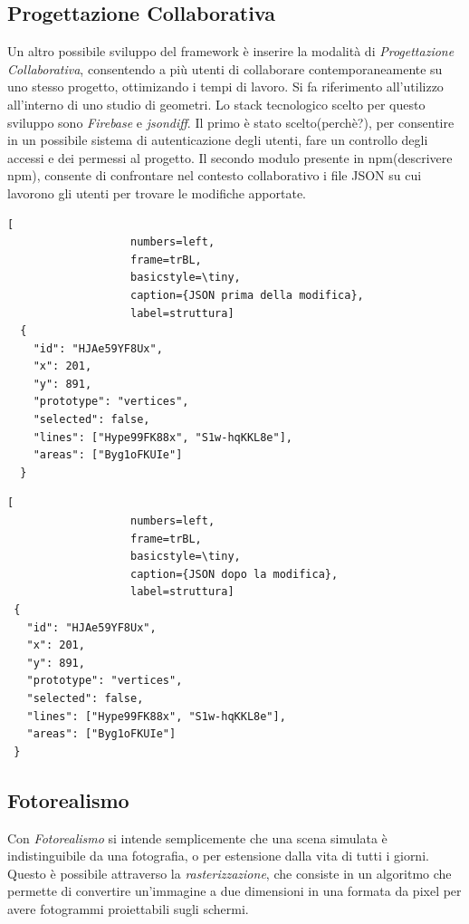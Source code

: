 \subsection{Progettazione Collaborativa}
\label{sec:conclusions_section_2_sub_2}
Un altro possibile sviluppo del framework è inserire la modalità di \emph{Progettazione Collaborativa}, consentendo a più utenti
di collaborare contemporaneamente su uno stesso progetto, ottimizando i tempi di lavoro. Si fa riferimento
all'utilizzo all'interno di uno studio di geometri. Lo stack tecnologico scelto per questo sviluppo sono
\emph{Firebase} e \emph{jsondiff}. Il primo è stato scelto(perchè?), per consentire in un possibile sistema di autenticazione degli utenti,
fare un controllo degli accessi e dei permessi al progetto.
Il secondo modulo presente in npm(descrivere npm), consente di confrontare nel contesto collaborativo i file JSON su cui lavorono
gli utenti per trovare le modifiche apportate.\\

\noindent
\begin{minipage}{.45\textwidth}
\begin{lstlisting}[
                   numbers=left,
                   frame=trBL,
                   basicstyle=\tiny,
                   caption={JSON prima della modifica},
                   label=struttura]
  {
    "id": "HJAe59YF8Ux",
    "x": 201,
    "y": 891,
    "prototype": "vertices",
    "selected": false,
    "lines": ["Hype99FK88x", "S1w-hqKKL8e"],
    "areas": ["Byg1oFKUIe"]
  }
\end{lstlisting}
\end{minipage}\hfill
\begin{minipage}{.45\textwidth}
\begin{lstlisting}[
                   numbers=left,
                   frame=trBL,
                   basicstyle=\tiny,
                   caption={JSON dopo la modifica},
                   label=struttura]
 {
   "id": "HJAe59YF8Ux",
   "x": 201,
   "y": 891,
   "prototype": "vertices",
   "selected": false,
   "lines": ["Hype99FK88x", "S1w-hqKKL8e"],
   "areas": ["Byg1oFKUIe"]
 }
\end{lstlisting}
\end{minipage}

\newpage

\subsection{Fotorealismo}
\label{sec:conclusions_section_2_sub_3}
Con \emph{Fotorealismo} si intende semplicemente che una scena simulata \`e indistinguibile da una fotografia, o per estensione
dalla vita di tutti i giorni. Questo è possibile attraverso la \emph{rasterizzazione}, che consiste in un algoritmo che
permette di convertire un'immagine a due dimensioni in una formata da pixel per avere fotogrammi proiettabili sugli schermi.

